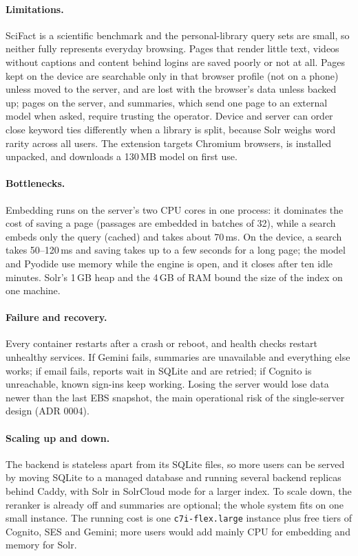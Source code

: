 \paragraph{Limitations.} SciFact is a scientific benchmark and the
personal-library query sets are small, so neither fully represents everyday
browsing. Pages that render little text, videos without captions and content
behind logins are saved poorly or not at all. Pages kept on the device are
searchable only in that browser profile (not on a phone) unless moved to the
server, and are lost with the browser's data unless backed up; pages on the
server, and summaries, which send one page to an external model when asked,
require trusting the operator. Device and server can order close keyword ties
differently when a library is split, because Solr weighs word rarity across
all users. The extension targets Chromium browsers, is installed unpacked,
and downloads a 130\,MB model on first use.

\paragraph{Bottlenecks.} Embedding runs on the server's two CPU cores in one
process: it dominates the cost of saving a page (passages are embedded in
batches of 32), while a search embeds only the query (cached) and takes
about 70\,ms. On the device, a search takes 50--120\,ms and saving takes up to
a few seconds for a long page; the model and Pyodide use memory while the
engine is open, and it closes after ten idle minutes. Solr's 1\,GB heap and the 4\,GB of RAM bound the size of the
index on one machine.

\paragraph{Failure and recovery.} Every container restarts after a crash or
reboot, and health checks restart unhealthy services. If Gemini fails,
summaries are unavailable and everything else works; if email fails, reports
wait in SQLite and are retried; if Cognito is unreachable, known sign-ins keep
working. Losing the server would lose data newer than the last EBS snapshot,
the main operational risk of the single-server design (ADR 0004).

\paragraph{Scaling up and down.} The backend is stateless apart from its
SQLite files, so more users can be served by moving SQLite to a managed
database and running several backend replicas behind Caddy, with Solr in
SolrCloud mode for a larger index. To scale down, the reranker is already off
and summaries are optional; the whole system fits on one small instance. The
running cost is one \texttt{c7i-flex.large} instance plus free tiers of
Cognito, SES and Gemini; more users would add mainly CPU for embedding and
memory for Solr.

